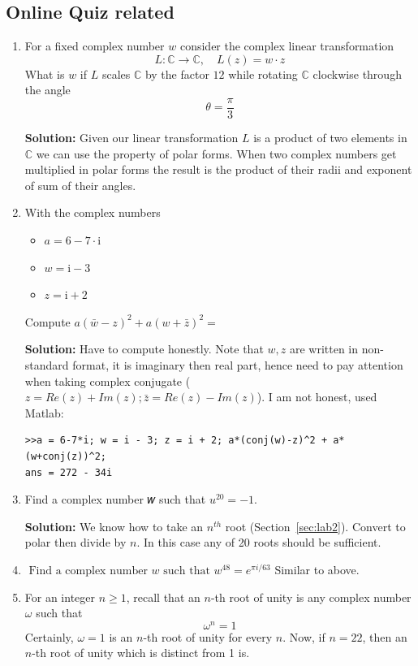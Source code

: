 \documentclass{article}
\begin{document}
\subsection{Online Quiz related}
\begin{enumerate}
\item For a fixed complex number $w$ consider the complex linear transformation
$$
L: \mathbb{C} \longrightarrow \mathbb{C}, \quad L(z)=w \cdot z
$$
What is $w$ if $L$ scales $\mathbb{C}$ by the factor $12$ while rotating $\mathbb{C}$ clockwise through the angle
$$
\theta=\frac{\pi}{3}
$$

\textbf{Solution:} Given our linear transformation $L$ is a product of two elements in $\mathbb{C}$ we can use the property of polar forms. When two complex numbers get multiplied in polar forms the result is the product of their radii and exponent of sum of their angles. 
\item With the complex numbers
\begin{itemize}
\item $a=6-7 \cdot \mathrm{i}$
\item $w=\mathrm{i}-3$
\item $z=\mathrm{i}+2$
\end{itemize}
Compute $a(\bar{w}-z)^2+a(w+\bar{z})^2=$

  \textbf{Solution:} Have to compute honestly. Note that $w,z$ are written in non-standard format, it is imaginary then real part, hence need to pay attention when taking complex conjugate ($z=Re(z) + Im(z); \bar{z}= Re(z) - Im(z)$).
I am not honest, used Matlab:
\begin{verbatim} 
>>a = 6-7*i; w = i - 3; z = i + 2; a*(conj(w)-z)^2 + a*(w+conj(z))^2;
ans = 272 - 34i 
\end{verbatim}
  \item Find a complex number 𝑤 such that  $u^{20}=−1$.

  \textbf{Solution:} We know how to take an $n^{th}$ root (Section~\ref{sec:lab2}). Convert to polar then divide by $n$. In this case any of 20 roots should be sufficient.
  \item $\text { Find a complex number } w \text { such that } w^{48}=e^{\pi i / 63}$ Similar to above. 
  \item For an integer $n \geq 1$, recall that an $n$-th root of unity is any complex number $\omega$ such that
$$
\omega^n=1
$$
Certainly, $\omega=1$ is an $n$-th root of unity for every $n$. Now, if $n=22$, then an $n$-th root of unity which is distinct from 1 is.


\end{enumerate}
\end{document}
